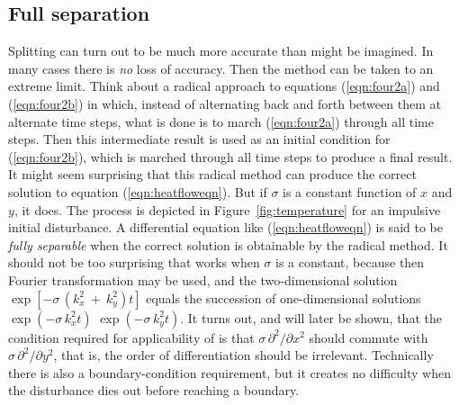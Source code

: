 \subsection{Full separation}
\par
Splitting can turn out to be much more accurate than might be imagined.
In many cases there is 
{\em 
no
}
loss of accuracy.
Then the method can be taken to an extreme limit.
Think about a radical approach to
equations (\ref{eqn:four2a}) and (\ref{eqn:four2b}) in which,
instead of alternating back and forth between them at alternate
time steps, what is done is to march
(\ref{eqn:four2a}) through all time steps.
Then this
intermediate result is used as an
initial condition for (\ref{eqn:four2b}), which is marched
through all time steps to produce a final
result.
It might seem surprising that this
radical method can produce the correct solution to equation (\ref{eqn:heatfloweqn}).
But if  $\sigma$  is a constant
function of  $x$  and  $y$, it does.
The process is depicted in Figure~\ref{fig:temperature}
for an impulsive initial disturbance.
A differential equation like (\ref{eqn:heatfloweqn}) is said to be
{\em 
fully separable
}
when the correct solution is obtainable
by the radical method.
It should not be
too surprising that  works
when  $\sigma$  is a constant, because then
Fourier transformation may be used,
and the two-dimensional
solution  $ \exp [ - \sigma\, ( k_x^2\ +\  k_y^2 ) t ]$  equals the
succession of one-dimensional solutions  $ \exp ( - \sigma\, {k_x^2} t )$
$\exp ( - \sigma\, {k_y^2} t )$.
It turns out, and will later be shown,
that the condition required for
applicability of  is
that  $ \sigma\, {\partial^2 / \partial x^2 }$  should commute
with  $ \sigma\, {\partial^2 / \partial y^2 }$,
that is, the order of differentiation should be irrelevant.
Technically there is also a boundary-condition requirement,
but it creates no difficulty when the
disturbance dies out before reaching
a boundary.

